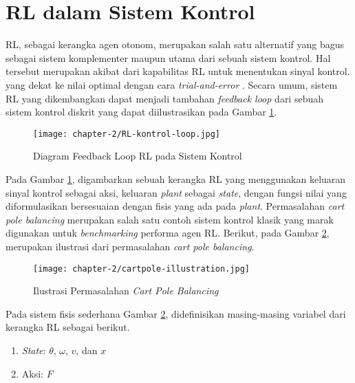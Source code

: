\section{\acl{RL} dalam Sistem Kontrol}

\ac{RL}, sebagai kerangka agen otonom, merupakan salah satu alternatif yang bagus sebagai sistem komplementer maupun utama dari sebuah sistem kontrol. Hal tersebut merupakan akibat dari kapabilitas \ac{RL} untuk menentukan sinyal kontrol. yang dekat ke nilai optimal dengan cara \textit{trial-and-error} \parencite{vichugov2005application}. Secara umum, sistem RL yang dikembangkan dapat menjadi tambahan \textit{feedback loop} dari sebuah sistem kontrol diskrit yang dapat diilustrasikan pada Gambar \ref{fig:RL-loop-kontrol}.


\begin{figure}[H]
	\centering
	\texttt{[image: chapter-2/RL-kontrol-loop.jpg]}
	\caption{Diagram Feedback Loop \ac{RL} pada Sistem Kontrol \parencite{vichugov2005application}}
	\label{fig:RL-loop-kontrol}
\end{figure}

Pada Gambar \ref{fig:RL-loop-kontrol}, digambarkan sebuah kerangka \ac{RL} yang menggunakan keluaran sinyal kontrol sebagai aksi, keluaran \textit{plant} sebagai \textit{state}, dengan fungsi nilai yang diformulasikan bersesuaian dengan fisis yang ada pada \textit{plant}. Permasalahan \textit{cart pole balancing} \parencite{nagendra2017comparison} merupakan salah satu contoh sistem kontrol klasik yang marak digunakan untuk \textit{benchmarking} performa agen \ac{RL}. Berikut, pada Gambar \ref{fig:cartpole-illustration}, merupakan ilustrasi dari permasalahan \textit{cart pole balancing}.

\begin{figure}[h]
	\centering
	\texttt{[image: chapter-2/cartpole-illustration.jpg]}
	\caption{Ilustrasi Permasalahan \textit{Cart Pole Balancing}}
	\label{fig:cartpole-illustration}
\end{figure}

Pada sistem fisis sederhana Gambar \ref{fig:cartpole-illustration}, didefinisikan masing-masing variabel dari kerangka \ac{RL} sebagai berikut.

\begin{enumerate}
	\item \textit{State}: \(\theta\), \(\omega\), \(v\), dan \(x\)
	\item Aksi: \(F\)
\end{enumerate}

